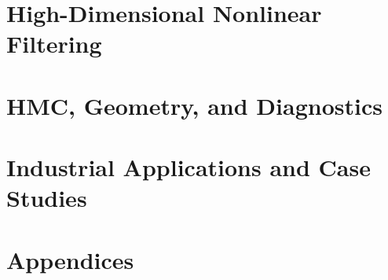 \documentclass[12pt,a4paper,openany]{book}
\begin{document}
\part{High-Dimensional Nonlinear Filtering}










\part{HMC, Geometry, and Diagnostics}







\part{Industrial Applications and Case Studies}








\appendix
\part*{Appendices}








\backmatter


\end{document}
